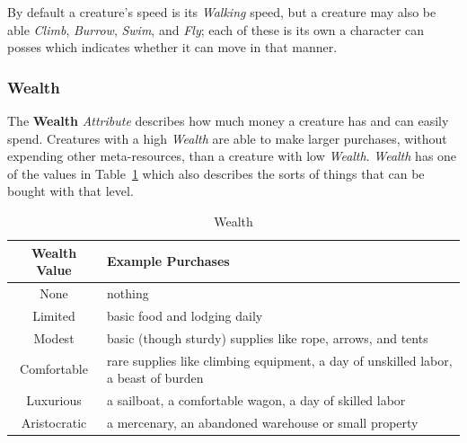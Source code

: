 By default a creature's speed is its \emph{Walking} speed, but a creature may also be able \emph{Climb}, \emph{Burrow}, \emph{Swim}, and \emph{Fly}; each of these is its own \Attribute{} a character can posses which indicates whether it can move in that manner.

\subsubsection{Wealth}
The \textbf{Wealth} \emph{Attribute} describes how much money a creature has and can easily spend.
Creatures with a high \emph{Wealth} are able to make larger purchases, without expending other meta-resources, than a creature with low \emph{Wealth}.
\emph{Wealth} has one of the values in Table~\ref{tab:wealth} which also describes the sorts of things that can be bought with that level.

\begin{table}
  \centering
  \begin{tabular}{|c|l|} \hline
    \textbf{Wealth Value} &\textbf{Example Purchases} \\ \hline
    None &nothing \\ \hline
    Limited &basic food and lodging daily \\ \hline
    Modest &basic (though sturdy) supplies like rope, arrows, and tents \\ \hline
    Comfortable &rare supplies like climbing equipment, a day of unskilled labor, a beast of burden \\ \hline
    Luxurious &a sailboat, a comfortable wagon, a day of skilled labor \\ \hline
    Aristocratic &a mercenary, an abandoned warehouse or small property \\ \hline
  \end{tabular}
  \caption{Wealth}
  \label{tab:wealth}
\end{table}

